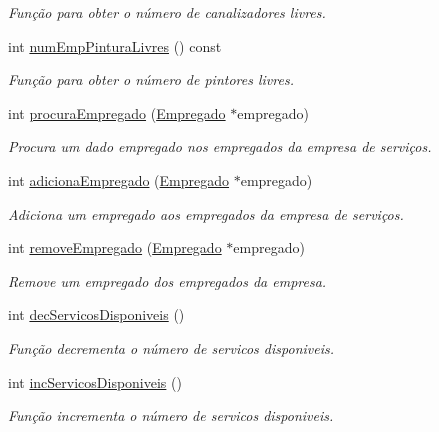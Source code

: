 \begin{DoxyCompactItemize}
\begin{DoxyCompactList}\small\item\em Função para obter o número de canalizadores livres. \end{DoxyCompactList}\item 
int \hyperlink{class_servico_a83583e1dca00f51715e03a1f33818494}{num\+Emp\+Pintura\+Livres} () const 
\begin{DoxyCompactList}\small\item\em Função para obter o número de pintores livres. \end{DoxyCompactList}\item 
int \hyperlink{class_servico_afe9dc57bcaa1f3ea20963d5e46b3c194}{procura\+Empregado} (\hyperlink{class_empregado}{Empregado} $\ast$empregado)
\begin{DoxyCompactList}\small\item\em Procura um dado empregado nos empregados da empresa de serviços. \end{DoxyCompactList}\item 
int \hyperlink{class_servico_a6e3eb546bad5975cf8e678ae4e6f6ea3}{adiciona\+Empregado} (\hyperlink{class_empregado}{Empregado} $\ast$empregado)
\begin{DoxyCompactList}\small\item\em Adiciona um empregado aos empregados da empresa de serviços. \end{DoxyCompactList}\item 
int \hyperlink{class_servico_af2d0e60b4f9b4c1a3e9c545d00a87659}{remove\+Empregado} (\hyperlink{class_empregado}{Empregado} $\ast$empregado)
\begin{DoxyCompactList}\small\item\em Remove um empregado dos empregados da empresa. \end{DoxyCompactList}\item 
int \hyperlink{class_servico_a61f4dc0bff250f3be3c23b495c2b0e91}{dec\+Servicos\+Disponiveis} ()
\begin{DoxyCompactList}\small\item\em Função decrementa o número de servicos disponiveis. \end{DoxyCompactList}\item 
int \hyperlink{class_servico_a099b6ca2af6f7d577d1fe6b36349975c}{inc\+Servicos\+Disponiveis} ()
\begin{DoxyCompactList}\small\item\em Função incrementa o número de servicos disponiveis. \end{DoxyCompactList}\item 

\end{DoxyCompactItemize}
